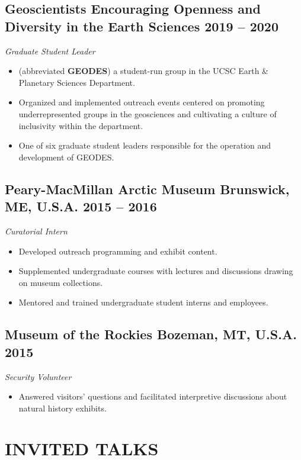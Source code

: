 \documentclass[10pt]{article}
\begin{document}
\subsection*{\textbf{Geoscientists Encouraging Openness and Diversity in the Earth Sciences} \hfill 2019 – 2020}
\textit{Graduate Student Leader}
\begin{itemize}
	\item (abbreviated \textbf{GEODES}) a student-run group in the UCSC Earth \& Planetary Sciences Department.
	\item Organized and implemented outreach events centered on promoting underrepresented groups in the geosciences and cultivating a culture of inclusivity within the department.
	\item One of six graduate student leaders responsible for the operation and development of GEODES.
\end{itemize}

\subsection*{\textbf{Peary-MacMillan Arctic Museum} \hspace{15pt} Brunswick, ME, U.S.A. \hfill 2015 – 2016}
\textit{Curatorial Intern}
\begin{itemize}
	\item Developed outreach programming and exhibit content.
	\item Supplemented undergraduate courses with lectures and discussions drawing on museum collections.
	\item Mentored and trained undergraduate student interns and employees.
\end{itemize}

\subsection*{\textbf{Museum of the Rockies} \hspace{15pt} Bozeman, MT, U.S.A. \hfill 2015}
\textit{Security Volunteer}
\begin{itemize}
	\item Answered visitors' questions and facilitated interpretive discussions about natural history exhibits.
\end{itemize}


\section*{INVITED TALKS}
\end{document}

